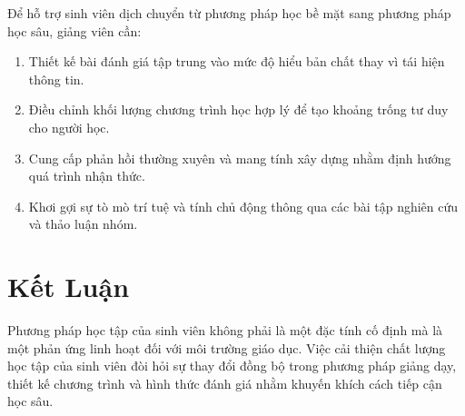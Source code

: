 \documentclass[12pt,a4paper]{article}
\begin{document}
Để hỗ trợ sinh viên dịch chuyển từ phương pháp học bề mặt sang phương pháp học sâu, giảng viên cần:
\begin{enumerate}
    \item Thiết kế bài đánh giá tập trung vào mức độ hiểu bản chất thay vì tái hiện thông tin.
    \item Điều chỉnh khối lượng chương trình học hợp lý để tạo khoảng trống tư duy cho người học.
    \item Cung cấp phản hồi thường xuyên và mang tính xây dựng nhằm định hướng quá trình nhận thức.
    \item Khơi gợi sự tò mò trí tuệ và tính chủ động thông qua các bài tập nghiên cứu và thảo luận nhóm.
\end{enumerate}

\section{Kết Luận}

Phương pháp học tập của sinh viên không phải là một đặc tính cố định mà là một phản ứng linh hoạt đối với môi trường giáo dục. Việc cải thiện chất lượng học tập của sinh viên đòi hỏi sự thay đổi đồng bộ trong phương pháp giảng dạy, thiết kế chương trình và hình thức đánh giá nhằm khuyến khích cách tiếp cận học sâu.
\end{document}
